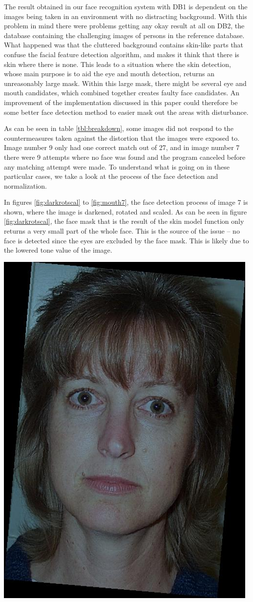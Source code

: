 The result obtained in our face recognition system with DB1 is dependent on the images being taken in an environment with no distracting background. With this problem in mind there were problems getting any okay result at all on DB2, the database containing the challenging images of persons in the reference database. What happened was that the cluttered background contains skin-like parts that confuse the facial feature detection algorithm, and makes it think that there is skin where there is none. This leads to a situation where the skin detection, whose main purpose is to aid the eye and mouth detection, returns an unreasonably large mask. Within this large mask, there might be several eye and mouth candidates, which combined together creates faulty face candidates. An improvement of the implementation discussed in this paper could therefore be some better face detection method to easier mask out the areas with disturbance.

As can be seen in table \ref{tbl:breakdown}, some images did not respond to the countermeasures taken against the distortion that the images were exposed to. Image number 9 only had one correct match out of 27, and in image number 7 there were 9 attempts where no face was found and the program canceled before any matching attempt were made. To understand what is going on in these particular cases, we take a look at the process of the face detection and normalization.


In figures \ref{fig:darkrotscal} to \ref{fig:mouth7}, the face detection process of image 7 is shown, where the image is darkened, rotated and scaled. As can be seen in figure \ref{fig:darkrotscal}, the face mask that is the result of the skin model function only returns a very small part of the whole face. This is the source of the issue – no face is detected since the eyes are excluded by the face mask. This is likely due to the lowered tone value of the image. 


\begin{Figure}
  \centering
    \includegraphics[width=0.5\columnwidth]{images/im7_img.jpg}
\end{Figure}

